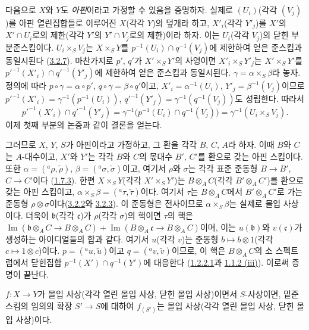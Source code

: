 다음으로 $X$와 $Y$도 \emph{아핀}이라고 가정할 수 있음을 증명하자.
실제로 $(U_i)$(각각 $(V_j)$)를 아핀 열린집합들로 이루어진 $X$(각각
$Y$)의 덮개라 하고, $X'_i$(각각 $Y'_j$)를 $X'$의
$X'\cap U_i$로의 제한(각각 $Y'$의 $Y'\cap V_j$로의 제한)이라 하자.
이는 $U_i$(각각 $V_j$)의 닫힌 부분준스킴이다.
$U_i\times_S V_j$는 $X\times_S Y$를
$p^{-1}(U_i)\cap q^{-1}(V_j)$에 제한하여 얻은 준스킴과 동일시된다
(\hyperref[I.3.2.7-ko]{3.2.7}). 마찬가지로 $p'$, $q'$가
$X'\times_S Y'$의 사영이면 $X'_i\times_S Y'_j$는
$X'\times_S Y'$를
${p'}^{-1}(X'_i)\cap{q'}^{-1}(Y'_j)$에 제한하여 얻은 준스킴과
동일시된다. $\gamma=\alpha\times_S\beta$라 놓자. 정의에 따라
$p\circ\gamma=\alpha\circ p'$, $q\circ\gamma=\beta\circ q'$이고,
$X'_i=\alpha^{-1}(U_i)$, $Y'_j=\beta^{-1}(V_j)$이므로
${p'}^{-1}(X'_i)=\gamma^{-1}(p^{-1}(U_i))$,
${q'}^{-1}(Y'_j)=\gamma^{-1}(q^{-1}(V_j))$도 성립한다. 따라서
\[
  {p'}^{-1}(X'_i)\cap{q'}^{-1}(Y'_j)
  =\gamma^{-1}\bigl(p^{-1}(U_i)\cap q^{-1}(V_j)\bigr)
  =\gamma^{-1}(U_i\times_S V_j).
\]
이제 첫째 부분의 논증과 같이 결론을 얻는다.

그러므로 $X$, $Y$, $S$가 아핀이라고 가정하고, 그 환을 각각 $B$,
$C$, $A$라 하자. 이때 $B$와 $C$는 $A$-대수이고, $X'$와 $Y'$는
각각 $B$와 $C$의 몫대수 $B'$, $C'$를 환으로 갖는 아핀 스킴이다.
또한 $\alpha=({}^a\rho,\widetilde{\rho})$,
$\beta=({}^a\sigma,\widetilde{\sigma})$이고, 여기서 $\rho$와
$\sigma$는 각각 표준 준동형 $B\to B'$, $C\to C'$이다
(\hyperref[I.1.7.3-ko]{1.7.3}). 한편 $X\times_S Y$(각각
$X'\times_S Y'$)는 $B\otimes_A C$(각각 $B'\otimes_A C'$)를 환으로
갖는 아핀 스킴이고,
$\alpha\times_S\beta=({}^a\tau,\widetilde{\tau})$이다. 여기서 $\tau$는
$B\otimes_A C$에서 $B'\otimes_A C'$로 가는 준동형
$\rho\otimes\sigma$이다(\hyperref[I.3.2.2-ko]{3.2.2}와
\hyperref[I.3.2.3-ko]{3.2.3}). 이 준동형은 전사이므로
$\alpha\times_S\beta$는 실제로 몰입 사상이다. 더욱이
$\mathfrak{b}$(각각 $\mathfrak{c}$)가 $\rho$(각각 $\sigma$)의
핵이면 $\tau$의 핵은
$\operatorname{Im}(\mathfrak{b}\otimes_A C\to B\otimes_A C)
+\operatorname{Im}(B\otimes_A\mathfrak{c}\to B\otimes_A C)$이며, 이는
$u(\mathfrak{b})$와 $v(\mathfrak{c})$가 생성하는 아이디얼들의 합과
같다. 여기서 $u$(각각 $v$)는 준동형 $b\mapsto b\otimes1$(각각
$c\mapsto1\otimes c$)이다. $p=({}^a u,\widetilde{u})$이고
$q=({}^a v,\widetilde{v})$이므로, 이 핵은 $B\otimes_A C$의 소
스펙트럼에서 닫힌집합 $p^{-1}(X')\cap q^{-1}(Y')$에 대응한다
(\hyperref[I.1.2.2.1-ko]{1.2.2.1}과
\hyperref[I.1.1.2-ko]{1.1.2 (iii)}). 이로써 증명이 끝난다.

\begin{corollary}[4.3.2]
\label{I.4.3.2-ko}
$f:X\to Y$가 몰입 사상(각각 열린 몰입 사상, 닫힌 몰입 사상)이면서
$S$-사상이면, 밑준스킴의 임의의 확장 $S'\to S$에 대하여
$f_{(S')}$는 몰입 사상(각각 열린 몰입 사상, 닫힌 몰입 사상)이다.
\end{corollary}

